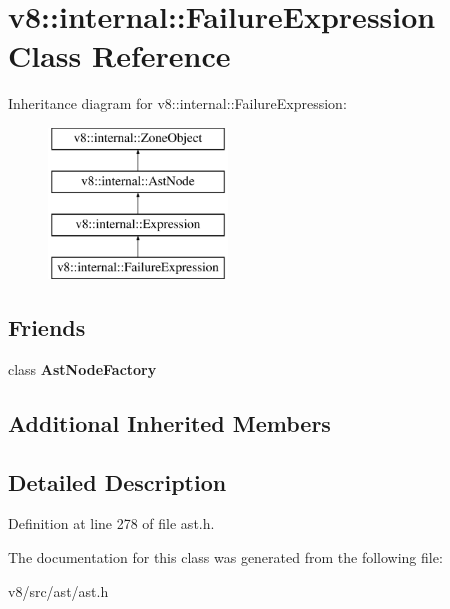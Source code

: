 \hypertarget{classv8_1_1internal_1_1FailureExpression}{}\section{v8\+:\+:internal\+:\+:Failure\+Expression Class Reference}
\label{classv8_1_1internal_1_1FailureExpression}
Inheritance diagram for v8\+:\+:internal\+:\+:Failure\+Expression\+:\begin{figure}[H]
\begin{center}
\leavevmode
\includegraphics[height=4.000000cm]{classv8_1_1internal_1_1FailureExpression}
\end{center}
\end{figure}
\subsection*{Friends}
\begin{DoxyCompactItemize}
\item 
\mbox{\label{classv8_1_1internal_1_1FailureExpression_a8d587c8ad3515ff6433eb83c578e795f}} 
class {\bfseries Ast\+Node\+Factory}
\end{DoxyCompactItemize}
\subsection*{Additional Inherited Members}


\subsection{Detailed Description}


Definition at line 278 of file ast.\+h.



The documentation for this class was generated from the following file\+:\begin{DoxyCompactItemize}
\item 
v8/src/ast/ast.\+h\end{DoxyCompactItemize}
